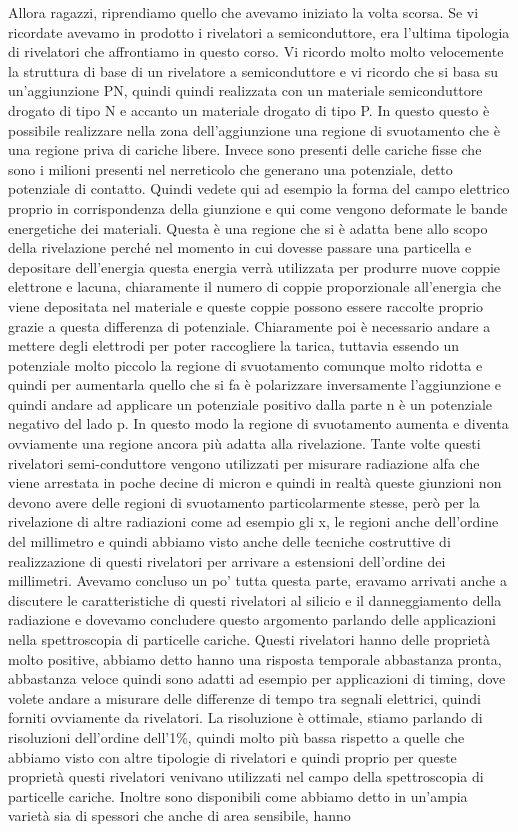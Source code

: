 {Allora ragazzi, riprendiamo quello che avevamo iniziato la volta scorsa. Se vi ricordate avevamo in prodotto i rivelatori a semiconduttore, era l'ultima tipologia di rivelatori che affrontiamo in questo corso. Vi ricordo molto molto velocemente la struttura di base di un rivelatore a semiconduttore e vi ricordo che si basa su un'aggiunzione PN, quindi quindi realizzata con un materiale semiconduttore drogato di tipo N e accanto un materiale drogato di tipo P. In questo questo è possibile realizzare nella zona dell'aggiunzione una regione di svuotamento che è una regione priva di cariche libere. Invece sono presenti delle cariche fisse che sono i milioni presenti nel nerreticolo che generano una potenziale, detto potenziale di contatto. Quindi vedete qui ad esempio la forma del campo elettrico proprio in corrispondenza della giunzione e qui come vengono deformate le bande energetiche dei materiali. Questa è una regione che si è adatta bene allo scopo della rivelazione perché nel momento in cui dovesse passare una particella e depositare dell'energia questa energia verrà utilizzata per produrre nuove coppie elettrone e lacuna, chiaramente il numero di coppie proporzionale all'energia che viene depositata nel materiale e queste coppie possono essere raccolte proprio grazie a questa differenza di potenziale. Chiaramente poi è necessario andare a mettere degli elettrodi per poter raccogliere la tarica, tuttavia essendo un potenziale molto piccolo la regione di svuotamento comunque molto ridotta e quindi per aumentarla quello che si fa è polarizzare inversamente l'aggiunzione e quindi andare ad applicare un potenziale positivo dalla parte n è un potenziale negativo del lado p. In questo modo la regione di svuotamento aumenta e diventa ovviamente una regione ancora più adatta alla rivelazione. Tante volte questi rivelatori semi-conduttore vengono utilizzati per misurare radiazione alfa che viene arrestata in poche decine di micron e quindi in realtà queste giunzioni non devono avere delle regioni di svuotamento particolarmente stesse, però per la rivelazione di altre radiazioni come ad esempio gli x, le regioni anche dell'ordine del millimetro e quindi abbiamo visto anche delle tecniche costruttive di realizzazione di questi rivelatori per arrivare a estensioni dell'ordine dei millimetri. Avevamo concluso un po' tutta questa parte, eravamo arrivati anche a discutere le caratteristiche di questi rivelatori al silicio e il danneggiamento della radiazione e dovevamo concludere questo argomento parlando delle applicazioni nella spettroscopia di particelle cariche. Questi rivelatori hanno delle proprietà molto positive, abbiamo detto hanno una risposta temporale abbastanza pronta, abbastanza veloce quindi sono adatti ad esempio per applicazioni di timing, dove volete andare a misurare delle differenze di tempo tra segnali elettrici, quindi forniti ovviamente da rivelatori. La risoluzione è ottimale, stiamo parlando di risoluzioni dell'ordine dell'1\%, quindi molto più bassa rispetto a quelle che abbiamo visto con altre tipologie di rivelatori e quindi proprio per queste proprietà questi rivelatori venivano utilizzati nel campo della spettroscopia di particelle cariche. Inoltre sono disponibili come abbiamo detto in un'ampia varietà sia di spessori che anche di area sensibile, hanno }
